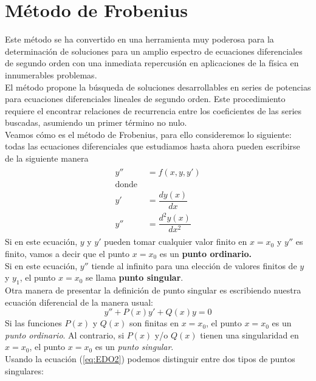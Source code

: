 \section{Método de Frobenius}
Este método se ha convertido en una herramienta muy poderosa para la determinación de soluciones para un amplio espectro de ecuaciones diferenciales de segundo orden con una inmediata repercusión en aplicaciones de la física en innumerables problemas.
\\
El método propone la búsqueda de soluciones desarrollables en series de potencias para ecuaciones diferenciales lineales de segundo orden. Este procedimiento requiere el encontrar relaciones de recurrencia entre los coeficientes de las series
buscadas, asumiendo un primer término no nulo.
\\
Veamos cómo es el método de Frobenius, para ello consideremos lo siguiente: todas las ecuaciones diferenciales que estudiamos hasta ahora pueden escribirse de la siguiente manera
\begin{eqnarray}
\begin{aligned}
y'' &= f(x,y,y') \\
\text{donde } \\
y' &= \dfrac{d y(x)}{dx} \\
y'' &= \dfrac{d^{2} y(x) }{d x^{2}}
\end{aligned}
\end{eqnarray}
Si en este ecuación, $y$ y $y'$  pueden tomar cualquier valor finito en $x = x_{0}$  y  $y''$  es finito, vamos a decir que el punto $x = x_{0}$ es un \textbf{punto ordinario.}
\\
Si en este ecuación, $y''$  tiende al infinito para una elección de valores finitos de $y$ y $y_{1}$, el punto $x = x_{0}$
se llama \textbf{punto singular}.
\\
Otra manera de presentar la definición de punto singular es escribiendo nuestra ecuación diferencial de la manera usual:
\begin{equation}
y'' + P(x) y' + Q(x) y =0 \label{eq:EDO2}
\end{equation}
Si las funciones $P(x)$ y $Q(x)$ son finitas en $x = x_{0}$, el punto $x = x_{0}$ es un \emph{punto ordinario}. Al 
contrario, si $P(x)$ y/o $Q(x)$ tienen una singularidad en $x = x_{0}$, el punto $x = x_{0}$ es un \emph{punto singular}.
\\
Usando la ecuación (\ref{eq:EDO2}) podemos distinguir entre dos tipos de puntos singulares:
